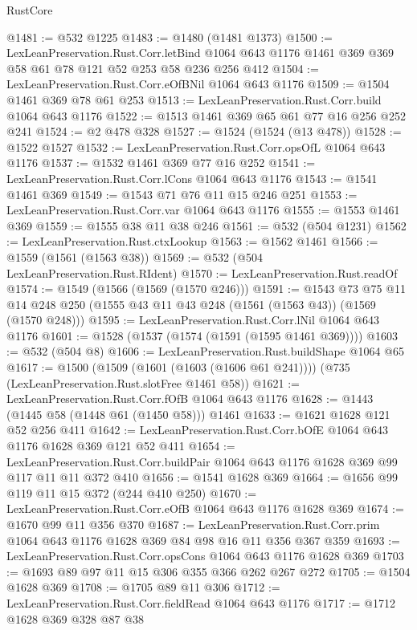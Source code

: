 \begin{lexlean}{RustCore}
\begin{coremodule}
@1481 := @532 @1225
@1483 := @1480 (@1481 @1373)
@1500 := LexLeanPreservation.Rust.Corr.letBind
    @1064
    @643
    @1176
    @1461
    @369
    @369
    @58
    @61
    @78
    @121
    @52
    @253
    @58
    @236
    @256
    @412
@1504 := LexLeanPreservation.Rust.Corr.eOfBNil @1064 @643 @1176
@1509 := @1504 @1461 @369 @78 @61 @253
@1513 := LexLeanPreservation.Rust.Corr.build @1064 @643 @1176
@1522 := @1513 @1461 @369 @65 @61 @77 @16 @256 @252 @241
@1524 := @2 @478 @328
@1527 := @1524 (@1524 (@13 @478))
@1528 := @1522 @1527
@1532 := LexLeanPreservation.Rust.Corr.opsOfL @1064 @643 @1176
@1537 := @1532 @1461 @369 @77 @16 @252
@1541 := LexLeanPreservation.Rust.Corr.lCons @1064 @643 @1176
@1543 := @1541 @1461 @369
@1549 := @1543 @71 @76 @11 @15 @246 @251
@1553 := LexLeanPreservation.Rust.Corr.var @1064 @643 @1176
@1555 := @1553 @1461 @369
@1559 := @1555 @38 @11 @38 @246
@1561 := @532 (@504 @1231)
@1562 := LexLeanPreservation.Rust.ctxLookup
@1563 := @1562 @1461
@1566 := @1559 (@1561 (@1563 @38))
@1569 := @532 (@504 LexLeanPreservation.Rust.RIdent)
@1570 := LexLeanPreservation.Rust.readOf
@1574 := @1549 (@1566 (@1569 (@1570 @246)))
@1591 := @1543
    @73
    @75
    @11
    @14
    @248
    @250
    (@1555 @43 @11 @43 @248 (@1561 (@1563 @43)) (@1569 (@1570 @248)))
@1595 := LexLeanPreservation.Rust.Corr.lNil @1064 @643 @1176
@1601 := @1528 (@1537 (@1574 (@1591 (@1595 @1461 @369))))
@1603 := @532 (@504 @8)
@1606 := LexLeanPreservation.Rust.buildShape @1064 @65
@1617 := @1500
    (@1509 (@1601 (@1603 (@1606 @61 @241))))
    (@735 (LexLeanPreservation.Rust.slotFree @1461 @58))
@1621 := LexLeanPreservation.Rust.Corr.fOfB @1064 @643 @1176
@1628 := @1443 (@1445 @58 (@1448 @61 (@1450 @58))) @1461
@1633 := @1621 @1628 @121 @52 @256 @411
@1642 := LexLeanPreservation.Rust.Corr.bOfE @1064 @643 @1176 @1628 @369 @121 @52 @411
@1654 := LexLeanPreservation.Rust.Corr.buildPair
    @1064
    @643
    @1176
    @1628
    @369
    @99
    @117
    @11
    @11
    @372
    @410
@1656 := @1541 @1628 @369
@1664 := @1656 @99 @119 @11 @15 @372 (@244 @410 @250)
@1670 := LexLeanPreservation.Rust.Corr.eOfB @1064 @643 @1176 @1628 @369
@1674 := @1670 @99 @11 @356 @370
@1687 := LexLeanPreservation.Rust.Corr.prim
    @1064
    @643
    @1176
    @1628
    @369
    @84
    @98
    @16
    @11
    @356
    @367
    @359
@1693 := LexLeanPreservation.Rust.Corr.opsCons @1064 @643 @1176 @1628 @369
@1703 := @1693 @89 @97 @11 @15 @306 @355 @366 @262 @267 @272
@1705 := @1504 @1628 @369
@1708 := @1705 @89 @11 @306
@1712 := LexLeanPreservation.Rust.Corr.fieldRead @1064 @643 @1176
@1717 := @1712 @1628 @369 @328 @87 @38

\end{coremodule}
\end{lexlean}
